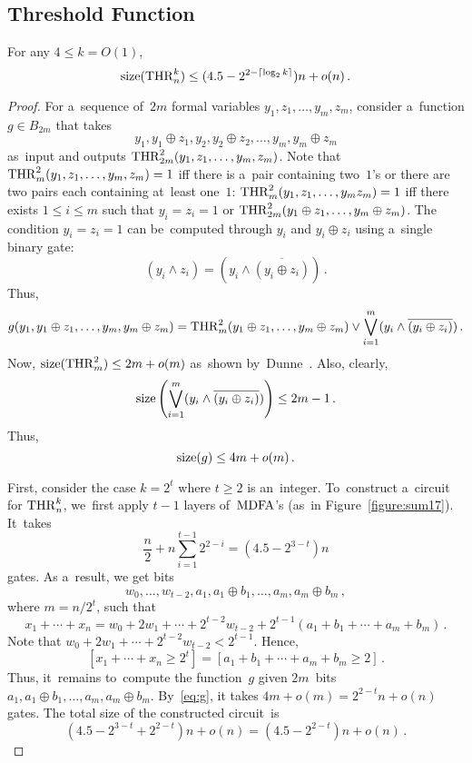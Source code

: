 \subsection{Threshold Function}
\begin{theorem}
    For any $4 \le k = O(1)$,
    \[
        \operatorname{size}(\operatorname{THR}_n^k) \le (4.5-2^{2 - \lceil \log_2k\rceil})n+o(n) \, .
    \]
\end{theorem}
\begin{proof}
    For a~sequence of~$2m$ formal variables $y_1, z_1, \dotsc, y_m, z_m$,
    consider a~function $g \in B_{2m}$ that takes
    \[y_1, y_1 \oplus z_1, y_2, y_2 \oplus z_2, \dotsc, y_m, y_m \oplus z_m\]
    as~input and outputs $\operatorname{THR}_{2m}^2(y_1, z_1, \dotsc, y_m, z_m)$.
    Note that $\operatorname{THR}_m^2(y_1, z_1, \dotsc, y_m, z_m)=1$ iff there is
    a~pair containing two~$1$'s or there are two pairs each containing at~least one~$1$: $\operatorname{THR}_m^2(y_1, z_1, \dotsc, y_m z_m)=1$ iff there exists
    $1 \le i \le m$ such that $y_i=z_i=1$ or $\operatorname{THR}_{2m}^2(y_1 \oplus z_1, \dotsc, y_m \oplus z_m)$. The condition $y_i=z_i=1$ can be~computed
    through $y_i$ and $y_i \oplus z_i$ using a~single binary gate:
    \[(y_i \land z_i)=(y_i \land \overline{(y_i \oplus z_i)}) \, .\]
    Thus,
    \[g(y_1, y_1 \oplus z_1,\dotsc, y_m, y_m \oplus z_m)=\operatorname{THR}_m^2(y_1 \oplus z_1, \dotsc, y_m \oplus z_m) \lor \bigvee_{i=1}^{m}(y_i \land \overline{(y_i \oplus z_i)}) \, .\]
    Now, $\operatorname{size}(\operatorname{THR}_m^2) \le 2m+o(m)$ as~shown by~Dunne~\cite{Dunne84}.
    Also, clearly,
    \[\operatorname{size}\left(\bigvee_{i=1}^{m}(y_i \land \overline{(y_i \oplus z_i)}) \right)\le 2m-1 \, .\]
    Thus,
    \begin{equation}\label{eq:g}
        \operatorname{size}(g) \le 4m+o(m) \, .
    \end{equation}


    First, consider the case $k=2^t$ where $t \ge 2$ is an~integer.
    To~construct a~circuit for $\operatorname{THR}_n^k$, we~first apply $t-1$
    layers of~$\operatorname{MDFA}$'s (as~in Figure~\ref{figure:sum17}). It~takes
    \[\frac{n}{2} + n\sum\limits_{i=1}^{t-1} 2^{2-i}=(4.5 - 2^{3-t})n\] gates.
    As a~result, we get bits \[w_0, \dotsc, w_{t-2}, a_1, a_1 \oplus b_1, \dotsc, a_m, a_m \oplus b_m \,, \]
    where $m=n/2^t$,
    such that
    \[x_1+\dotsb+x_n=w_0+2w_1+\dotsb+2^{t-2}w_{t-2}+2^{t-1}(a_1+b_1+\dotsb+a_m+b_m) \, .\]
    Note that $w_0+2w_1+\dotsb+2^{t-2}w_{t-2} < 2^{t-1}$. Hence,
    \[[x_1+\dotsb+x_n \ge 2^t]=[a_1+b_1+\dotsb+a_m+b_m \ge 2]\,.\]
    Thus, it~remains to~compute the function~$g$
    given $2m$~bits $a_1, a_1 \oplus b_1, \dotsc, a_m, a_m \oplus b_m$.
    By~\eqref{eq:g}, it takes $4m+o(m)=2^{2-t}n+o(n)$ gates.
    The total size of the constructed circuit~is
    \[(4.5-2^{3-t}+2^{2-t})n+o(n)=(4.5-2^{2-t})n+o(n) \, .\]


\end{proof}
